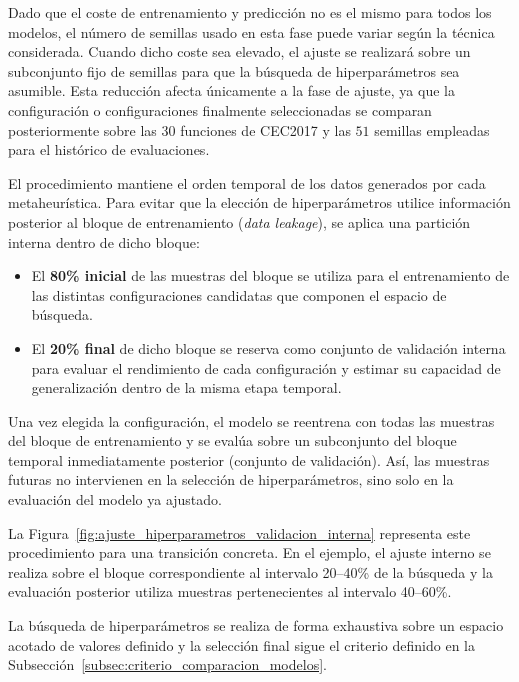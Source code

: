 Dado que el coste de entrenamiento y predicción no es el mismo para todos los modelos, el número de semillas usado en esta fase puede variar según la técnica considerada. Cuando dicho coste sea elevado, el ajuste se realizará sobre un subconjunto fijo de semillas para que la búsqueda de hiperparámetros sea asumible.
Esta reducción afecta únicamente a la fase de ajuste, ya que la configuración o configuraciones finalmente seleccionadas se comparan posteriormente sobre las \(30\) funciones de CEC2017
y las \(51\) semillas empleadas para el histórico de evaluaciones.

El procedimiento mantiene el orden temporal de los datos generados por cada metaheurística. Para evitar que la elección de hiperparámetros utilice información posterior al bloque de entrenamiento (\textit{data leakage}), se aplica una partición interna dentro de dicho bloque:

\begin{itemize}
    \item El \textbf{80\% inicial} de las muestras del bloque se utiliza para el entrenamiento de las distintas configuraciones candidatas que componen el espacio de búsqueda.
    \item El \textbf{20\% final} de dicho bloque se reserva como conjunto de validación interna para evaluar el rendimiento de cada configuración y estimar su capacidad de generalización dentro de la misma etapa temporal.
\end{itemize}

Una vez elegida la configuración, el modelo se reentrena con todas las muestras del bloque de entrenamiento y se evalúa sobre un subconjunto del bloque temporal inmediatamente posterior (conjunto de validación). Así, las muestras futuras no intervienen en la selección de hiperparámetros, sino solo en la evaluación del modelo ya ajustado.

La Figura~\ref{fig:ajuste_hiperparametros_validacion_interna} representa este
procedimiento para una transición concreta. En el ejemplo, el ajuste interno
se realiza sobre el bloque correspondiente al intervalo 20--40\% de la
búsqueda y la evaluación posterior utiliza muestras pertenecientes al
intervalo 40--60\%.



La búsqueda de hiperparámetros se realiza de forma exhaustiva sobre un espacio acotado de valores definido y la selección final sigue el criterio definido en la Subsección~\ref{subsec:criterio_comparacion_modelos}.

